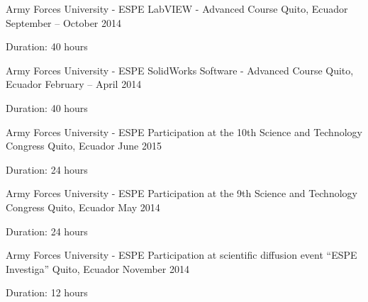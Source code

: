
\begin{cventries}

  \cventry
    {Army Forces University - ESPE}
    {LabVIEW - Advanced Course}
    {Quito, Ecuador}
    {September – October 2014}
    {
      \begin{cvitems}
        \item {Duration: 40 hours}
      \end{cvitems}
    }
    
  \cventry
   {Army Forces University - ESPE}
    {SolidWorks Software - Advanced Course}
    {Quito, Ecuador}
    {February – April 2014}
   {
      \begin{cvitems}
        \item {Duration: 40 hours}
      \end{cvitems}
    }
 
  \cventry
   {Army Forces University - ESPE}
    {Participation at the 10th Science and Technology Congress}
    {Quito, Ecuador}
    {June 2015}
    {
      \begin{cvitems}
        \item {Duration: 24 hours}
      \end{cvitems}
    }
   
  \cventry
   {Army Forces University - ESPE}
    {Participation at the 9th Science and Technology Congress}
    {Quito, Ecuador}
    {May 2014}
    {
      \begin{cvitems}
        \item {Duration: 24 hours}
      \end{cvitems}
    }
       
  \cventry
   {Army Forces University - ESPE}
    {Participation at scientific diffusion event “ESPE Investiga”}
    {Quito, Ecuador}
    {November 2014}
    {
      \begin{cvitems}
        \item {Duration: 12 hours}
      \end{cvitems}
    }
       
\end{cventries}

